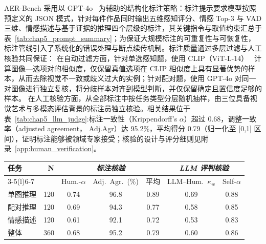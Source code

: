 AER-Bench 采用以 GPT-4o~\cite{achiam2023gpt} 为辅助的结构化标注策略：标注提示要求模型按照预定义的 JSON 模式，针对每件作品同时输出五维感知评分、情感 Top-3 与 VAD 三维、情感描述与基于证据的推理四个层级的标注，其关键指令与取值约束汇总于表~\ref{tab:chap5_prompt_summary}；为保证大规模标注的可重复性与可恢复性，标注管线引入了系统化的错误处理与断点续传机制。标注质量通过多层过滤与人工核验共同保证：
在自动过滤方面，针对单选感知题，使用 CLIP（ViT-L-14）~\cite{radford2021learning} 计算图像—选项对的相似度，仅保留真值选项在 CLIP 相似度上具有显著优势的样本，从而去除视觉不一致或歧义过大的实例；针对配对题，使用 GPT-4o 对同一对图像进行独立复核，将分歧样本对齐到模型判断，并仅保留确定且置信度足够的样本。
在人工核验方面，从全部标注中按任务类型分层随机抽样，由三位具备视觉艺术与多模态评估背景的标注员独立核验。相关结果位于表~\ref{tab:chap5_llm_judge}:标注一致性（Krippendorff's $\alpha$）超过 0.68，调整一致率（adjusted agreement， Adj.Agr）达 95.2\%，平均得分 0.79（归一化至 [0,1] 区间），证明标注能够被领域专家接受；核验的设计与评分细则见附录~\ref{app:human_verification}。


\begin{table}[!htbp]
    \vspace{0.5em}\centering\wuhao
    \setlength{\tabcolsep}{4pt}
    \begin{tabular}{lrccccc}
    \toprule
    \multirow{2}{*}{任务} & \multirow{2}{*}{N} &
    \multicolumn{3}{c}{\textit{标注核验}} &
    \multicolumn{2}{c}{\textit{LLM 评判核验}} \\
    \cmidrule(lr){3-5}\cmidrule(l){6-7}
     & &
    Hum.-$\alpha$ & Adj.\ Agr.\ (\%) & 平均 & LLM--Hum.\ $\kappa_w$ & Self-$\alpha$ \\
    \midrule
    单图推理 & 120 & 0.74 & 96.8 & 0.89 & 0.69 & 0.88 \\
    配对推理 & 120 & 0.69 & 94.3 & 0.77 & 0.58 & 0.85 \\
    情感描述 & 120 & 0.61 & 92.1 & 0.72 & 0.53 & 0.83 \\
    \midrule
    整体 & 360 & 0.68 & 95.2 & 0.79 & 0.60 & 0.86 \\
    \bottomrule
    \end{tabular}
\end{table}

